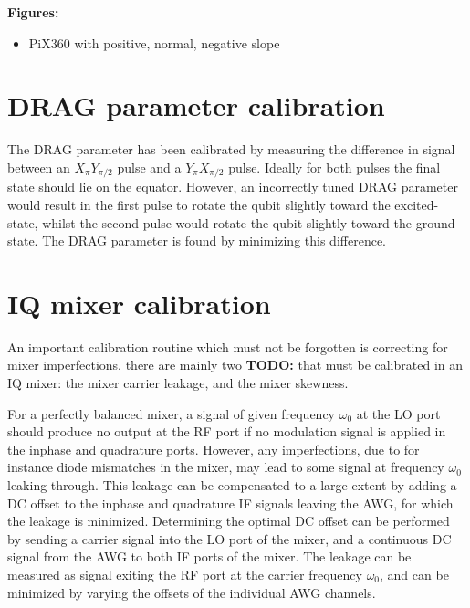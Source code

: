       \textbf{Figures:}
      \begin{itemize}
        \item PiX360 with positive, normal, negative slope
      \end{itemize}

    \section{DRAG parameter calibration}
      The DRAG parameter has been calibrated by measuring the difference in signal between an $X_{\pi} Y_{\pi/2}$ pulse and a $Y_{\pi} X_{\pi/2}$ pulse. Ideally for both pulses the final state should lie on the equator. However, an incorrectly tuned DRAG parameter would result in the first pulse to rotate the qubit slightly toward the excited-state, whilst the second pulse would rotate the qubit slightly toward the ground state. The DRAG parameter is found by minimizing this difference.

    \section{IQ mixer calibration}
      \label{sec:Mixer calibration}
      An important calibration routine which must not be forgotten is correcting for mixer imperfections. there are mainly two \textbf{TODO:} that must be calibrated in an IQ mixer: the mixer carrier leakage, and the mixer skewness.

      For a perfectly balanced mixer, a signal of given frequency $\omega_0$ at the LO port should produce no output at the RF port if no modulation signal is applied in the inphase and quadrature ports.  However, any imperfections, due to for instance diode mismatches in the mixer, may lead to some signal at frequency $\omega_0$ leaking through. This leakage can be compensated to a large extent by adding a DC offset to the inphase and quadrature IF signals leaving the AWG, for which the leakage is minimized. Determining the optimal DC offset can be performed by sending a carrier signal into the LO port of the mixer, and a continuous DC signal from the AWG to both IF ports of the mixer. The leakage can be measured as signal exiting the RF port at the carrier frequency $\omega_0$, and can be minimized by varying the offsets of the individual AWG channels.

